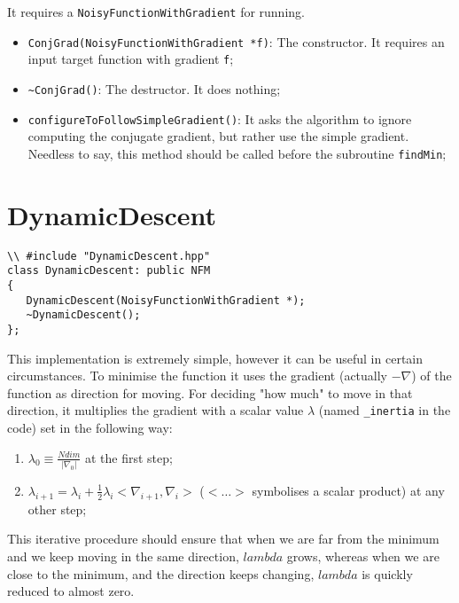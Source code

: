 \documentclass[11pt,a4paper,twoside]{article}
\begin{document}
It requires a \verb+NoisyFunctionWithGradient+ for running.

\begin{itemize}
   \item \verb+ConjGrad(NoisyFunctionWithGradient *f)+: The constructor. It requires an input target function with gradient \verb+f+;
   \item \verb+~ConjGrad()+: The destructor. It does nothing;
   \item \verb+configureToFollowSimpleGradient()+: It asks the algorithm to ignore computing the conjugate gradient, but rather use the simple gradient. Needless to say, this method should be called before the subroutine \verb+findMin+;
\end{itemize}





\section{DynamicDescent} %
\label{sec:dynamicdescent}

\begin{lstlisting}
\\ #include "DynamicDescent.hpp"
class DynamicDescent: public NFM
{
   DynamicDescent(NoisyFunctionWithGradient *);
   ~DynamicDescent();   
};
\end{lstlisting}

This implementation is extremely simple, however it can be useful in certain circumstances. To minimise the function it uses the gradient (actually $-\nabla$) of the function as direction for moving. For deciding "how much" to move in that direction, it multiplies the gradient with a scalar value $\lambda$ (named \verb+_inertia+ in the code) set in the following way:
\begin{enumerate}
\item $\lambda_0 \equiv \frac{Ndim}{\left| \nabla_0 \right|}$ at the first step;
\item $\lambda_{i+1} = \lambda_i + \frac{1}{2} \lambda_i <\nabla_{i+1}, \nabla_i>$ ($< \dots >$ symbolises a scalar product) at any other step;
\end{enumerate}
This iterative procedure should ensure that when we are far from the minimum and we keep moving in the same direction, $lambda$ grows, whereas when we are close to the minimum, and the direction keeps changing, $lambda$ is quickly reduced to almost zero.
\end{document}

